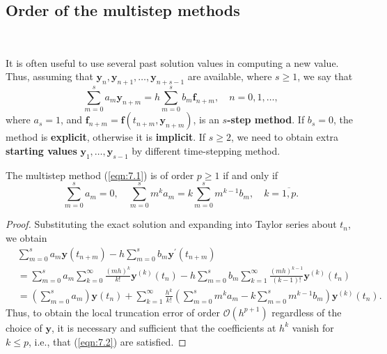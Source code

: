 \documentclass[a4paper]{article}
\begin{document}
\subsection{Order of the multistep methods}
\ \vspace*{-1.5em}
\begin{definition}
    It is often useful to use several past solution values in computing a new value. Thus, assuming that $\mathbf{y}_n, \mathbf{y}_{n+1}, \ldots, \mathbf{y}_{n+s-1}$ are available, where $s \geq 1$, we say that
\begin{equation}\label{eqn:7.1}
    \sum_{m=0}^s a_m \mathbf{y}_{n+m}=h \sum_{m=0}^s b_m \mathbf{f}_{n+m}, \quad n=0,1, \ldots,
\end{equation}
where $a_s=1$, and $\mathbf{f}_{n+m}=\mathbf{f}\left(t_{n+m}, \mathbf{y}_{n+m}\right)$, is an \textbf{$s$-step method}. If $b_s=0$, the method is \textbf{explicit}, otherwise it is \textbf{implicit}. If $s \geq 2$, we need to obtain extra \textbf{starting values} $\mathbf{y}_1, \ldots, \mathbf{y}_{s-1}$ by different time-stepping method.
\end{definition}

\begin{theorem}
    The multistep method (\ref{eqn:7.1}) is of order $p \geq 1$ if and only if
\begin{equation}\label{eqn:7.2}
    \sum_{m=0}^s a_m=0, \quad \sum_{m=0}^s m^k a_m=k \sum_{m=0}^s m^{k-1} b_m, \quad k=\overline{1,p}. 
\end{equation}
\end{theorem}

\begin{proof}
    Substituting the exact solution and expanding into Taylor series about $t_n$, we obtain
\[
\begin{aligned}
&\sum_{m=0}^s a_m \mathbf{y}\left(t_{n+m}\right)-h \sum_{m=0}^s b_m \mathbf{y}^{\prime}\left(t_{n+m}\right)\\ 
&=\sum_{m=0}^s a_m \sum_{k=0}^{\infty} \frac{(m h)^k}{k !} \mathbf{y}^{(k)}\left(t_n\right)-h \sum_{m=0}^s b_m \sum_{k=1}^{\infty} \frac{(m h)^{k-1}}{(k-1) !} \mathbf{y}^{(k)}\left(t_n\right) \\
&=\left(\sum_{m=0}^s a_m\right) \mathbf{y}\left(t_n\right)+\sum_{k=1}^{\infty} \frac{h^k}{k !}\left(\sum_{m=0}^s m^k a_m-k \sum_{m=0}^s m^{k-1} b_m\right) \mathbf{y}^{(k)}\left(t_n\right) .
\end{aligned}
\]
Thus, to obtain the local truncation error of order $\mathcal{O}\left(h^{p+1}\right)$ regardless of the choice of $\mathbf{y}$, it is necessary and sufficient that the coefficients at $h^k$ vanish for $k \leq p$, i.e., that (\ref{eqn:7.2}) are satisfied.
\end{proof}
\end{document}
